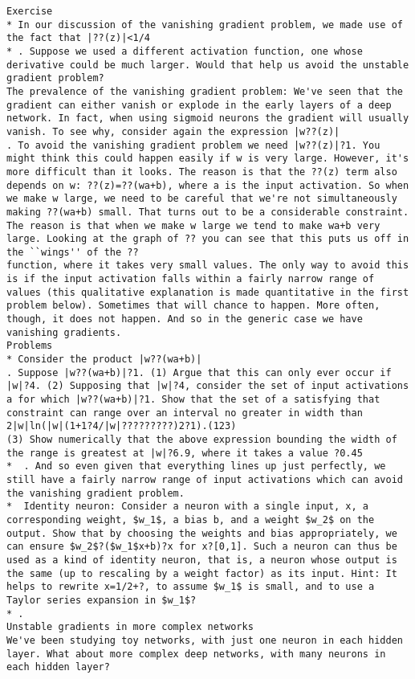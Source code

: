 \begin{lstlisting}
Exercise
* In our discussion of the vanishing gradient problem, we made use of the fact that |??(z)|<1/4
* . Suppose we used a different activation function, one whose derivative could be much larger. Would that help us avoid the unstable gradient problem? 
The prevalence of the vanishing gradient problem: We've seen that the gradient can either vanish or explode in the early layers of a deep network. In fact, when using sigmoid neurons the gradient will usually vanish. To see why, consider again the expression |w??(z)|
. To avoid the vanishing gradient problem we need |w??(z)|?1. You might think this could happen easily if w is very large. However, it's more difficult than it looks. The reason is that the ??(z) term also depends on w: ??(z)=??(wa+b), where a is the input activation. So when we make w large, we need to be careful that we're not simultaneously making ??(wa+b) small. That turns out to be a considerable constraint. The reason is that when we make w large we tend to make wa+b very large. Looking at the graph of ?? you can see that this puts us off in the ``wings'' of the ??
function, where it takes very small values. The only way to avoid this is if the input activation falls within a fairly narrow range of values (this qualitative explanation is made quantitative in the first problem below). Sometimes that will chance to happen. More often, though, it does not happen. And so in the generic case we have vanishing gradients.
Problems
* Consider the product |w??(wa+b)|
. Suppose |w??(wa+b)|?1. (1) Argue that this can only ever occur if |w|?4. (2) Supposing that |w|?4, consider the set of input activations a for which |w??(wa+b)|?1. Show that the set of a satisfying that constraint can range over an interval no greater in width than 
2|w|ln(|w|(1+1?4/|w|?????????)2?1).(123)
(3) Show numerically that the above expression bounding the width of the range is greatest at |w|?6.9, where it takes a value ?0.45
*  . And so even given that everything lines up just perfectly, we still have a fairly narrow range of input activations which can avoid the vanishing gradient problem.
*  Identity neuron: Consider a neuron with a single input, x, a corresponding weight, $w_1$, a bias b, and a weight $w_2$ on the output. Show that by choosing the weights and bias appropriately, we can ensure $w_2$?($w_1$x+b)?x for x?[0,1]. Such a neuron can thus be used as a kind of identity neuron, that is, a neuron whose output is the same (up to rescaling by a weight factor) as its input. Hint: It helps to rewrite x=1/2+?, to assume $w_1$ is small, and to use a Taylor series expansion in $w_1$?
* . 
Unstable gradients in more complex networks
We've been studying toy networks, with just one neuron in each hidden layer. What about more complex deep networks, with many neurons in each hidden layer?


\end{lstlisting}
